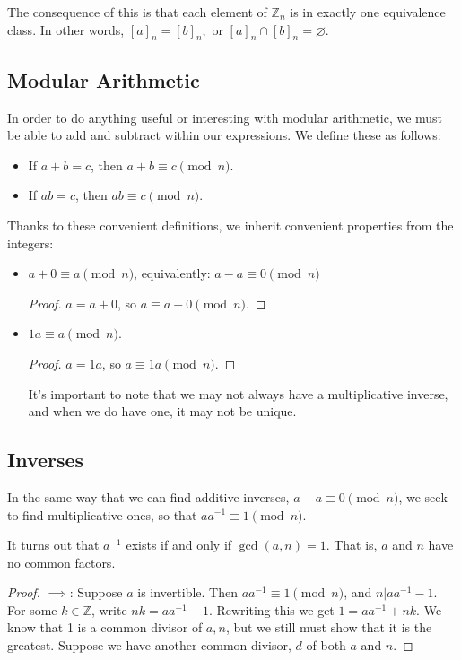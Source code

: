 \documentclass{article}
\begin{document}
The consequence of this is that each element of $\mathbb{Z}_n$ is in exactly one equivalence class. In other words, $[a]_n=[b]_n,$ or $[a]_n\cap [b]_n=\varnothing$.

\subsection{Modular Arithmetic}

In order to do anything useful or interesting with modular arithmetic, we must be able to add and subtract within our expressions. We define these as follows:

\begin{itemize}
    \item If $a+b=c$, then $a+b\equiv c\pmod{n}$.
    \item If $ab=c$, then $ab\equiv c\pmod{n}$.
\end{itemize}
Thanks to these convenient definitions, we inherit convenient properties from the integers:
\begin{itemize}
    \item $a+0\equiv a\pmod{n}$, equivalently: $a-a\equiv 0\pmod{n}$
        \begin{proof} 
            $a=a+0$, so $a\equiv a+0\pmod{n} $.
        \end{proof}
    \item $1a\equiv a\pmod{n}$.
        \begin{proof} 
            $a=1a$, so $a\equiv 1a\pmod{n} $.
        \end{proof}
        It's important to note that we may not always have a multiplicative inverse, and when we do have one, it may not be unique.
\end{itemize}

\subsection{Inverses}

In the same way that we can find additive inverses, $a-a\equiv 0\pmod{ n} $, we seek to find multiplicative ones, so that $aa^{-1}\equiv 1\pmod{n} $.

It turns out that $a^{-1}$ exists if and only if $\gcd(a,n)=1$. That is, $a$ and $n$ have no common factors.
\begin{proof} 
    $\implies$: Suppose $a$ is invertible. Then $aa^{-1}\equiv 1\pmod{n} $, and $n|aa^{-1}-1$. For some $k\in \mathbb{Z}$, write $nk=aa^{-1}-1$. Rewriting this we get $1=aa^{-1}+nk$. We know that 1 is a common divisor of $a,n$, but we still must show that it is the greatest. Suppose we have another common divisor, $d$ of both $a$ and $n$.

\end{proof}
\end{document}
